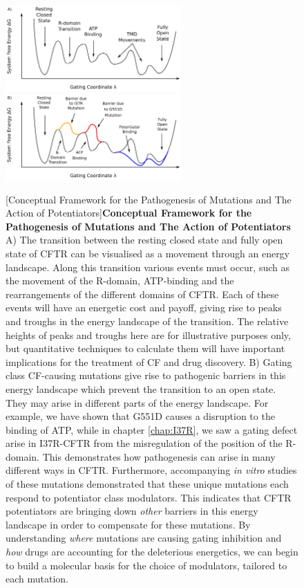 \begin{figure}
	\begin{center}
		\begingroup
	\includegraphics[width=0.6\textwidth]{figures/perspective/drug_landscape_1.pdf}\\
	\includegraphics[width=0.6\textwidth]{figures/perspective/drug_landscape_3.pdf}\\
		\endgroup
	\end{center}
	\begingroup
	\captionsetup{singlelinecheck = false, justification=raggedright}
	[Conceptual Framework for the Pathogenesis of Mutations and The Action of Potentiators]{\textbf{Conceptual Framework for the Pathogenesis of Mutations and The Action of Potentiators}{ A) The transition between the resting closed state and fully open state of CFTR can be visualised as a movement through an energy landscape. Along this transition various events must occur, such as the movement of the R-domain, ATP-binding and the rearrangements of the different domains of CFTR. Each of these events will have an energetic cost and payoff, giving rise to peaks and troughs in the energy landscape of the transition. The relative heights of peaks and troughs here are for illustrative purposes only, but quantitative techniques to calculate them will have important implications for the treatment of CF and drug discovery. B) Gating class CF-causing mutations give rise to pathogenic barriers in this energy landscape which prevent the transition to an open state. They may arise in different parts of the energy landscape. For example, we have shown that G551D causes a disruption to the binding of ATP, while in chapter \ref{chap:I37R}, we saw a gating defect arise in I37R-CFTR from the misregulation of the position of the R-domain. This demonstrates how pathogenesis can arise in many different ways in CFTR. Furthermore, accompanying \textit{in vitro} studies of these mutations demonstrated that these unique mutations each respond to potentiator class modulators. This indicates that CFTR potentiators are bringing down \textit{other} barriers in this energy landscape in order to compensate for these mutations. By understanding \textit{where} mutations are causing gating inhibition and \textit{how} drugs are accounting for the deleterious energetics, we can begin to build a molecular basis for the choice of modulators, tailored to each mutation.}}
	\label{drug_action_model}

	\endgroup
\end{figure}

